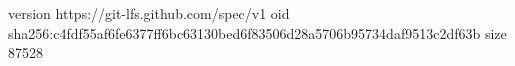 version https://git-lfs.github.com/spec/v1
oid sha256:c4fdf55af6fe6377ff6bc63130bed6f83506d28a5706b95734daf9513c2df63b
size 87528
